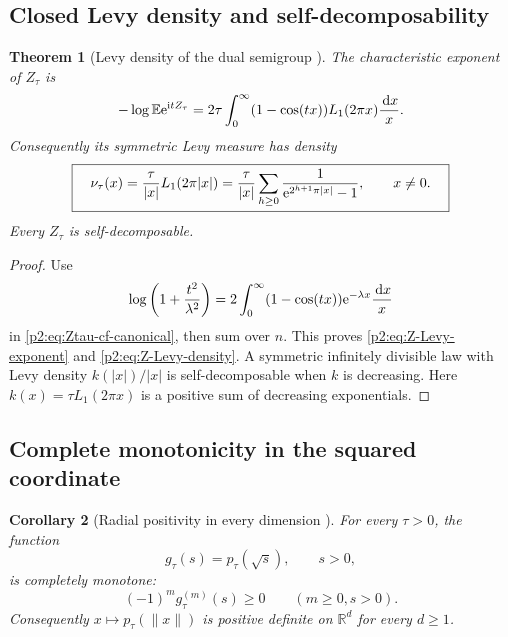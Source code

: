 \documentclass[11pt]{article}
\newtheorem{theorem}{Theorem}[section]
\newtheorem{corollary}[theorem]{Corollary}
\theoremstyle{definition}
\theoremstyle{remark}
\newcommand{\R}{\mathbb R}
\newcommand{\E}{\mathbb E}
\newcommand{\dd}{\,\mathrm d}
\begin{document}
\subsection{Closed Levy density and self-decomposability}

\begin{theorem}[Levy density of the dual semigroup \New]
The characteristic exponent of $Z_\tau$ is
\begin{equation}
 -\log\E\e^{\ii tZ_\tau}
 =2\tau\int_0^\infty(1-\cos(tx))L_1(2\pi x)\frac{\dd x}{x}.  \label{p2:eq:Z-Levy-exponent}
\end{equation}
Consequently its symmetric Levy measure has density
\begin{equation}
 \boxed{\quad
 \nu_\tau(x)=\frac{\tau}{|x|}L_1(2\pi|x|)
 =\frac{\tau}{|x|}\sum_{h\ge0}
   \frac{1}{\mathrm e^{2^{h+1}\pi|x|}-1},
 \qquad x\ne0.
 \quad}                                                  \label{p2:eq:Z-Levy-density}
\end{equation}
Every $Z_\tau$ is self-decomposable.
\end{theorem}

\begin{proof}
Use
\[
 \log\left(1+\frac{t^2}{\lambda^2}\right)
 =2\int_0^\infty(1-\cos(tx))\e^{-\lambda x}\frac{\dd x}{x}
\]
in \eqref{p2:eq:Ztau-cf-canonical}, then sum over $n$.  This proves
\eqref{p2:eq:Z-Levy-exponent} and \eqref{p2:eq:Z-Levy-density}.  A symmetric infinitely divisible
law with Levy density $k(|x|)/|x|$ is self-decomposable when $k$ is decreasing.  Here
$k(x)=\tau L_1(2\pi x)$ is a positive sum of decreasing exponentials.
\end{proof}

\subsection{Complete monotonicity in the squared coordinate}

\begin{corollary}[Radial positivity in every dimension \New]
For every $\tau>0$, the function
\begin{equation}
 g_\tau(s)=p_\tau(\sqrt s),\qquad s>0,                    \label{p2:eq:g-density}
\end{equation}
is completely monotone:
\begin{equation}
 (-1)^m g_\tau^{(m)}(s)\ge0\qquad(m\ge0,s>0).            \label{p2:eq:CM-density}
\end{equation}
Consequently $x\mapsto p_\tau(\|x\|)$ is positive definite on $\R^d$ for every
$d\ge1$.
\end{corollary}
\end{document}
